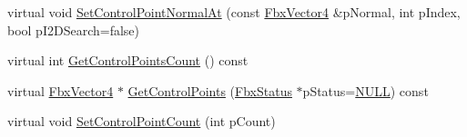 \begin{DoxyCompactItemize}
virtual void \hyperlink{class_fbx_geometry_base_a219c072f0c9a67ddcc928ab3998f9494}{Set\+Control\+Point\+Normal\+At} (const \hyperlink{class_fbx_vector4}{Fbx\+Vector4} \&p\+Normal, int p\+Index, bool p\+I2\+D\+Search=false)
\item 
virtual int \hyperlink{class_fbx_geometry_base_aa9f42ae6a958036722670143fabf3b17}{Get\+Control\+Points\+Count} () const
\item 
virtual \hyperlink{class_fbx_vector4}{Fbx\+Vector4} $\ast$ \hyperlink{class_fbx_geometry_base_ad4db22a2f2e673c216cacdc9cd172d77}{Get\+Control\+Points} (\hyperlink{class_fbx_status}{Fbx\+Status} $\ast$p\+Status=\hyperlink{fbxarch_8h_a070d2ce7b6bb7e5c05602aa8c308d0c4}{N\+U\+LL}) const
\item 
virtual void \hyperlink{class_fbx_geometry_base_aea3fc519575d88c430221b0e74040b0c}{Set\+Control\+Point\+Count} (int p\+Count)
\end{DoxyCompactItemize}
